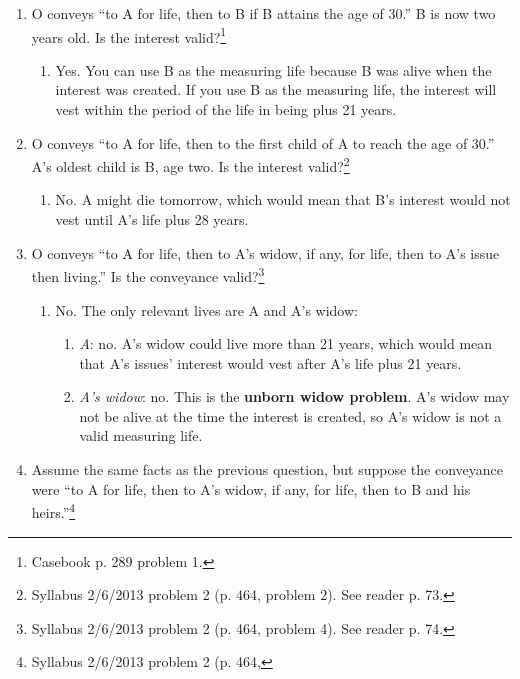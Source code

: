 \begin{enumerate}
    \item O conveys ``to A for life, then to B if B attains the age of 30.'' B 
    is now two years old. Is the interest valid?\footnote{Casebook p. 289 
    problem 1.}
    \begin{enumerate}
        \item Yes. You can use B as the measuring life because B was alive 
        when the interest was created. If you use B as the measuring life, the 
        interest will vest within the period of the life in being plus 21 
        years.
    \end{enumerate}
    \item O conveys ``to A for life, then to the first child of A to reach the 
    age of 30.'' A's oldest child is B, age two. Is the interest 
    valid?\footnote{Syllabus 2/6/2013 problem 2 (p. 464, problem 2). See 
    reader p. 73.}
    \begin{enumerate}
        \item No. A might die tomorrow, which would 
        mean that B's interest would not vest until A's life plus 28 
        years.
    \end{enumerate}
    \item O conveys ``to A for life, then to A's widow, if any, for life, then 
    to A's issue then living.'' Is the conveyance valid?\footnote{Syllabus 
    2/6/2013 problem 2 (p. 464, problem 4). See reader p. 74.}
    \begin{enumerate}
        \item No. The only relevant lives are A and A's widow:
        \begin{enumerate}
            \item \emph{A}: no. A's widow could live more than 21 years, which 
            would mean that A's issues' interest would vest after A's life 
            plus 21 years.
            \item \emph{A's widow}: no. This is the \textbf{unborn widow 
            problem}. A's widow may not be alive at the time the interest is 
            created, so A's widow is not a valid measuring life.
        \end{enumerate}
    \end{enumerate}
    \item Assume the same facts as the previous question, but suppose the 
    conveyance were ``to A for life, then to A's widow, if any, for life, then 
    to B and his heirs.''\footnote{Syllabus 2/6/2013 problem 2 (p. 464, 
}
\end{enumerate}
